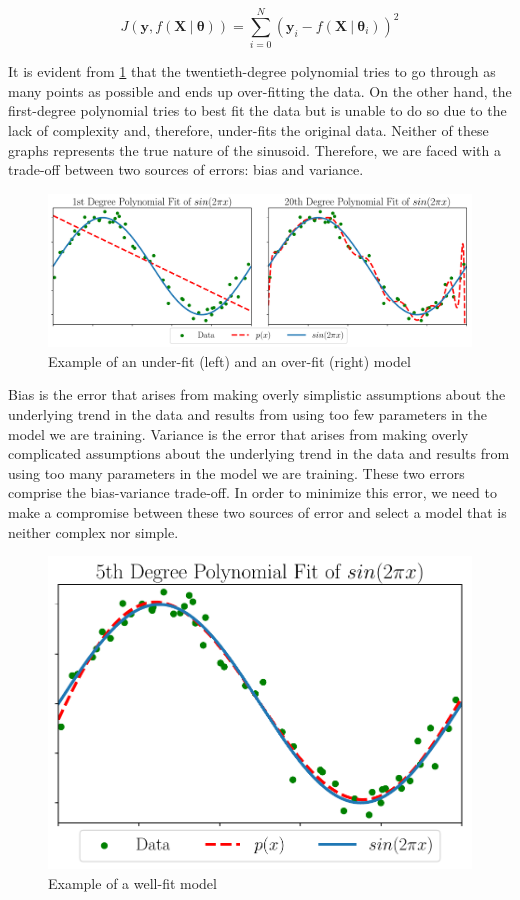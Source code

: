 \begin{equation}
	\label{eq:leastsquares}
	J(\mathbf{y}, f(\mathbf{X} \ | \ \boldsymbol{\theta})) = \sum_{i=0}^{N} (\mathbf{y}_i  - f(\mathbf{X} \ | \ \boldsymbol{\theta}_i))^2
\end{equation}


It is evident from \cref{fig:overfit} that the twentieth-degree polynomial tries to go through as many points as possible and ends up over-fitting the data. On the other hand, the first-degree polynomial tries to best fit the data but is unable to do so due to the lack of complexity and, therefore, under-fits the original data. Neither of these graphs represents the true nature of the sinusoid. Therefore, we are faced with a trade-off between two sources of errors: bias and variance. 

\begin{figure}[!ht]
	\centering
	\includegraphics[width=\linewidth]{pictures/poly_fit.pdf}
	\caption[Example of an under-fit and an over-fit model]{Example of an under-fit (left) and an over-fit (right) model}\label{fig:overfit}  
\end{figure}

Bias is the error that arises from making overly simplistic assumptions about the underlying trend in the data and results from using too few parameters in the model we are training. Variance is the error that arises from making overly complicated assumptions about the underlying trend in the data and results from using too many parameters in the model we are training. These two errors comprise the bias-variance trade-off. In order to minimize this error, we need to make a compromise between these two sources of error and select a model that is neither complex nor simple.

\begin{figure}[!ht]
	\centering
	\includegraphics[width=0.5\linewidth]{pictures/poly_fit_correct.pdf}
	\caption{Example of a well-fit model}\label{fig:wellfit}  
\end{figure}

